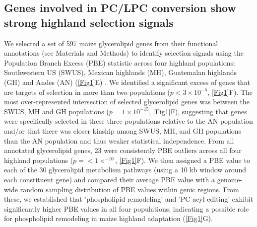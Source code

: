 \documentclass[9pt,twocolumn,twoside,lineno]{biorxiv}
\begin{document}
\subsection{Genes involved in PC/LPC conversion show strong highland selection signals} 
We selected a set of 597 maize glycerolipid genes from their functional annotations (see Materials and Methods) to identify selection signals using the Population Branch Excess (PBE) \cite{Pool2017-oa} statistic across four highland populations: Southwestern US (SWUS), Mexican highlands (MH), Guatemalan highlands (GH) and Andes (AN) (\cref{Fig1}E) \cite{Wang2020-mp}. 
We identified a significant excess of genes that are targets of selection in more than two populations ($ p< 3 \times 10^{-5}$, \ref{Fig1}F).
The most over-represented intersection of selected glycerolipid genes was between the SWUS, MH and GH populations ($p = 1  \times 10 ^{-15} $, \cref{Fig1}F), suggesting that genes were specifically selected in these three populations relative to the AN population and/or that there was closer kinship among SWUS, MH, and GH populations than the AN population and thus weaker statistical independence.
From all annotated glycerolipid genes, 23 were consistently PBE outliers across all four highland populations ($p =<1  \times  ^{-10}$, \cref{Fig1}F).
We then assigned a PBE value to each of the 30 glycerolipid metabolism pathways (using a 10 kb window around each constituent gene)  and compared their average PBE value with a genome-wide random sampling distribution of PBE values within genic regions. 
From these, we established that 'phospholipid remodeling' and 'PC acyl editing' exhibit significantly higher PBE values in all four populations, indicating a possible role for phospholipid remodeling in maize highland adaptation
(\cref{Fig1}G). 
\end{document}
